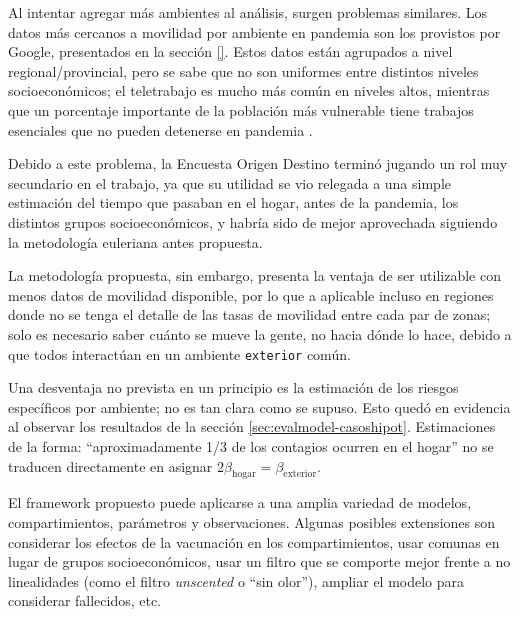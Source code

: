 Al intentar agregar más ambientes al análisis, surgen problemas similares. Los datos más cercanos a movilidad por ambiente en pandemia son los provistos por Google, presentados en la sección \ref{}. Estos datos están agrupados a nivel regional/provincial, pero se sabe \cite{Olivares2020} que no son uniformes entre distintos niveles socioeconómicos; el teletrabajo es mucho más común en niveles altos, mientras que un porcentaje importante de la población más vulnerable tiene trabajos esenciales que no pueden detenerse en pandemia \cite{}.

Debido a este problema, la Encuesta Origen Destino terminó jugando un rol muy secundario en el trabajo, ya que su utilidad se vio relegada a una simple estimación del tiempo que pasaban en el hogar, antes de la pandemia, los distintos grupos socioeconómicos, y habría sido de mejor aprovechada siguiendo la metodología euleriana antes propuesta. 

La metodología propuesta, sin embargo, presenta la ventaja de ser utilizable con menos datos de movilidad disponible, por lo que a aplicable incluso en regiones donde no se tenga el detalle de las tasas de movilidad entre cada par de zonas; solo es necesario saber cuánto se mueve la gente, no hacia dónde lo hace, debido a que todos interactúan en un ambiente \texttt{exterior} común.

Una desventaja no prevista en un principio es la estimación de los riesgos específicos por ambiente; no es tan clara como se supuso. Esto quedó en evidencia al observar los resultados de la sección \ref{sec:evalmodel-casoshipot}. Estimaciones de la forma: ``aproximadamente 1/3 de los contagios ocurren en el hogar'' \cite{Ferguson2020} no se traducen directamente en asignar \( 2 \beta_{\text{hogar}} = \beta_{\text{exterior}}\).


El framework propuesto puede aplicarse a una amplia variedad de modelos, compartimientos, parámetros y observaciones. Algunas posibles extensiones son considerar los efectos de la vacunación en los compartimientos, usar comunas en lugar de grupos socioeconómicos, usar un filtro que se comporte mejor frente a no linealidades (como el filtro \textit{unscented} o ``sin olor''), ampliar el modelo para considerar fallecidos, etc.

